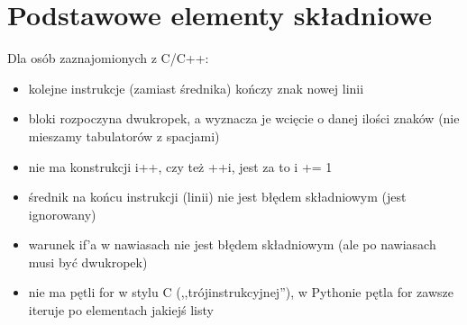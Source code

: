 % 
% 
% 
% 

\section{Podstawowe elementy składniowe}

\begin{teacherOnly}
\noindent Dla osób zaznajomionych z C/C++:
\begin{itemize}
\item kolejne instrukcje (zamiast średnika) kończy znak nowej linii
\item bloki rozpoczyna dwukropek, a wyznacza je wcięcie o danej ilości znaków (nie mieszamy tabulatorów z spacjami)
\item nie ma konstrukcji i++, czy też ++i, jest za to i += 1
\item średnik na końcu instrukcji (linii) nie jest błędem składniowym (jest ignorowany)
\item warunek if'a w nawiasach nie jest błędem składniowym (ale po nawiasach musi być dwukropek)
\item nie ma pętli for w stylu C (,,trójinstrukcyjnej''), w Pythonie pętla for zawsze iteruje po elementach jakiejś listy
\end{itemize}
\end{teacherOnly}


